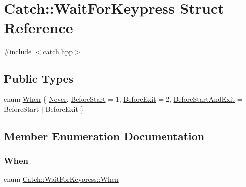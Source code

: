 \hypertarget{struct_catch_1_1_wait_for_keypress}{}\section{Catch\+::Wait\+For\+Keypress Struct Reference}
\label{struct_catch_1_1_wait_for_keypress}


{\ttfamily \#include $<$catch.\+hpp$>$}

\subsection*{Public Types}
\begin{DoxyCompactItemize}
\item 
enum \mbox{\hyperlink{struct_catch_1_1_wait_for_keypress_a2e8c4369d0a605d64e3e83b5af3399ba}{When}} \{ \mbox{\hyperlink{struct_catch_1_1_wait_for_keypress_a2e8c4369d0a605d64e3e83b5af3399baa3a78e4f64675e7ce54ffd29e6109f1ce}{Never}}, 
\mbox{\hyperlink{struct_catch_1_1_wait_for_keypress_a2e8c4369d0a605d64e3e83b5af3399baaba7f6d9b2377122a118b371ab7ae3185}{Before\+Start}} = 1, 
\mbox{\hyperlink{struct_catch_1_1_wait_for_keypress_a2e8c4369d0a605d64e3e83b5af3399baad6c3e4a5797b7ee0a812e4fc88128983}{Before\+Exit}} = 2, 
\mbox{\hyperlink{struct_catch_1_1_wait_for_keypress_a2e8c4369d0a605d64e3e83b5af3399baae8beb496b712aef908028a7cbfdd0c46}{Before\+Start\+And\+Exit}} = Before\+Start $\vert$ Before\+Exit
 \}
\end{DoxyCompactItemize}


\subsection{Member Enumeration Documentation}
\mbox{\label{struct_catch_1_1_wait_for_keypress_a2e8c4369d0a605d64e3e83b5af3399ba}} 
\subsubsection{\texorpdfstring{When}{When}}
{\footnotesize\ttfamily enum \mbox{\hyperlink{struct_catch_1_1_wait_for_keypress_a2e8c4369d0a605d64e3e83b5af3399ba}{Catch\+::\+Wait\+For\+Keypress\+::\+When}}}

